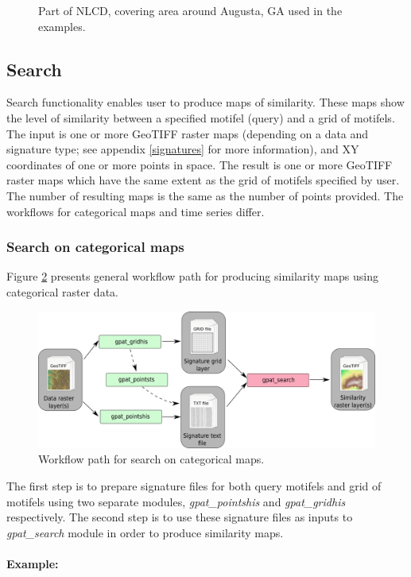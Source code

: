 \documentclass[12pt,margin=0.5in]{article}
\begin{document}
\begin{figure}[H]
	\centering
	\caption{Part of NLCD, covering area around Augusta, GA used in the examples.}
	\label{FIG:AUGUSTA}
\end{figure}

\FloatBarrier

\subsection{Search}

Search functionality enables user to produce maps of similarity. These maps show the level of similarity between a specified motifel (query) and a grid of motifels. The input is one or more GeoTIFF raster maps (depending on a data and signature type; see appendix \ref{signatures} for more information), and XY coordinates of one or more points in space. The result is one or more GeoTIFF raster maps which have the same extent as the grid of motifels specified by user. The number of resulting maps is the same as the number of points provided. The workflows for categorical maps and time series differ.

\subsubsection{Search on categorical maps}
Figure \ref{FIG:SEARCH} presents general workflow path for producing similarity maps using categorical raster data. 

\begin{figure}[H]
	\centering
	\includegraphics[width=\textwidth]{search_scheme.png}
	\caption{Workflow path for search on categorical maps.}
	\label{FIG:SEARCH}
\end{figure}

The first step is to prepare signature files for both query motifels and grid of motifels using two separate modules, {\it gpat\_pointshis} and {\it gpat\_gridhis} respectively. The second step is to use these signature files as inputs to {\it gpat\_search} module in order to produce similarity maps.\\\\
{\bf Example:}
\end{document}
